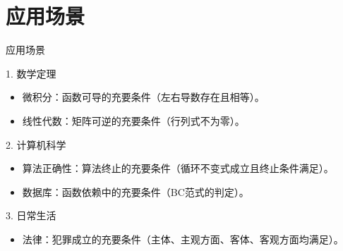 \documentclass[UTF8]{beamer}
\begin{document}
\section{应用场景}
\begin{frame}{应用场景}
  \begin{exampleblock}{1. 数学定理}
    \begin{itemize}
      \item 微积分：函数可导的充要条件（左右导数存在且相等）。
      \item 线性代数：矩阵可逆的充要条件（行列式不为零）。
    \end{itemize}
  \end{exampleblock}
  
  \begin{exampleblock}{2. 计算机科学}
    \begin{itemize}
      \item 算法正确性：算法终止的充要条件（循环不变式成立且终止条件满足）。
      \item 数据库：函数依赖中的充要条件（BC范式的判定）。
    \end{itemize}
  \end{exampleblock}
  
  \begin{exampleblock}{3. 日常生活}
    \begin{itemize}
      \item 法律：犯罪成立的充要条件（主体、主观方面、客体、客观方面均满足）。
    \end{itemize}
  \end{exampleblock}
\end{frame}

\end{document}
